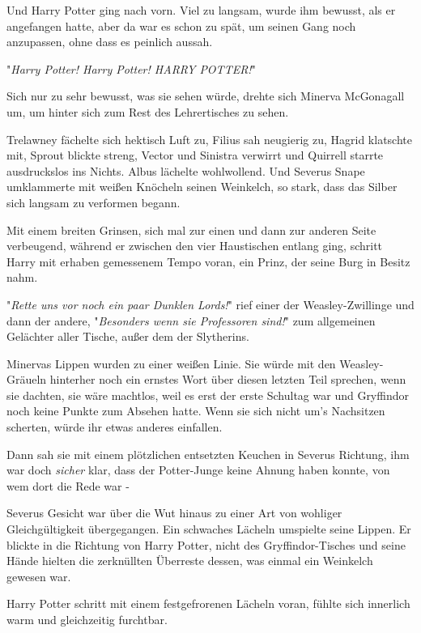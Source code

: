 {Und Harry Potter ging nach vorn. Viel zu langsam, wurde ihm bewusst, als er angefangen hatte, aber da war es schon zu spät, um seinen Gang noch anzupassen, ohne dass es peinlich aussah.

\later

"\emph{Harry Potter! Harry Potter! HARRY POTTER!}"

Sich nur zu sehr bewusst, was sie sehen würde, drehte sich Minerva McGonagall um, um hinter sich zum Rest des Lehrertisches zu sehen.

Trelawney fächelte sich hektisch Luft zu, Filius sah neugierig zu, Hagrid klatschte mit, Sprout blickte streng, Vector und Sinistra verwirrt und Quirrell starrte ausdruckslos ins Nichts. Albus lächelte wohlwollend. Und Severus Snape umklammerte mit weißen Knöcheln seinen Weinkelch, so stark, dass das Silber sich langsam zu verformen begann.

Mit einem breiten Grinsen, sich mal zur einen und dann zur anderen Seite verbeugend, während er zwischen den vier Haustischen entlang ging, schritt Harry mit erhaben gemessenem Tempo voran, ein Prinz, der seine Burg in Besitz nahm.

"\emph{Rette uns vor noch ein paar Dunklen Lords!}" rief einer der Weasley-Zwillinge und dann der andere, "\emph{Besonders wenn sie Professoren sind!}" zum allgemeinen Gelächter aller Tische, außer dem der Slytherins.

Minervas Lippen wurden zu einer weißen Linie. Sie würde mit den Weasley-Gräueln hinterher noch ein ernstes Wort über diesen letzten Teil sprechen, wenn sie dachten, sie wäre machtlos, weil es erst der erste Schultag war und Gryffindor noch keine Punkte zum Absehen hatte. Wenn sie sich nicht um's Nachsitzen scherten, würde ihr etwas anderes einfallen.

Dann sah sie mit einem plötzlichen entsetzten Keuchen in Severus Richtung, ihm war doch \emph{sicher} klar, dass der Potter-Junge keine Ahnung haben konnte, von wem dort die Rede war -

Severus Gesicht war über die Wut hinaus zu einer Art von wohliger Gleichgültigkeit übergegangen. Ein schwaches Lächeln umspielte seine Lippen. Er blickte in die Richtung von Harry Potter, nicht des Gryffindor-Tisches und seine Hände hielten die zerknüllten Überreste dessen, was einmal ein Weinkelch gewesen war.

\later

Harry Potter schritt mit einem festgefrorenen Lächeln voran, fühlte sich innerlich warm und gleichzeitig furchtbar.

}
